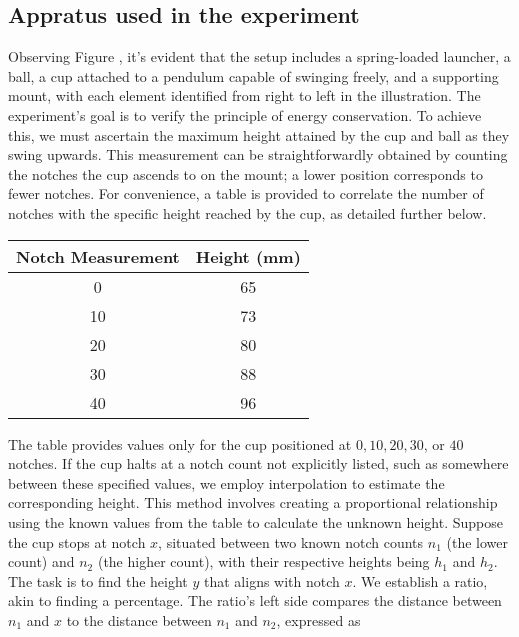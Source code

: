 \documentclass{report}
\begin{document}
    \subsection{Appratus used in the experiment}
    \bigbreak \noindent 
    \bigbreak \noindent 
    Observing Figure \thefigtitle, it's evident that the setup includes a spring-loaded launcher, a ball, a cup attached to a pendulum capable of swinging freely, and a supporting mount, with each element identified from right to left in the illustration. The experiment's goal is to verify the principle of energy conservation. To achieve this, we must ascertain the maximum height attained by the cup and ball as they swing upwards. This measurement can be straightforwardly obtained by counting the notches the cup ascends to on the mount; a lower position corresponds to fewer notches. For convenience, a table is provided to correlate the number of notches with the specific height reached by the cup, as detailed further below.
    \bigbreak \noindent 
    \begin{center}
        \begin{tabular}{c|c}
            Notch Measurement & Height (mm) \\
            \hline
            0 &65 \\ 
            10 & 73\\ 
            20  & 80\\
            30 & 88\\ 
            40  &96
        \end{tabular}
    \end{center}
    \bigbreak \noindent 
    The table provides values only for the cup positioned at $0, 10, 20, 30$, or $40$ notches. If the cup halts at a notch count not explicitly listed, such as somewhere between these specified values, we employ interpolation to estimate the corresponding height. This method involves creating a proportional relationship using the known values from the table to calculate the unknown height. Suppose the cup stops at notch $x$, situated between two known notch counts $n_1$ (the lower count) and $n_2$ (the higher count), with their respective heights being $h_1$ and $h_2$. The task is to find the height $y$ that aligns with notch $x$.
    \bigbreak \noindent
    We establish a ratio, akin to finding a percentage. The ratio's left side compares the distance between $n_1$ and $x$ to the distance between $n_1$ and $n_2$, expressed as
\end{document}
